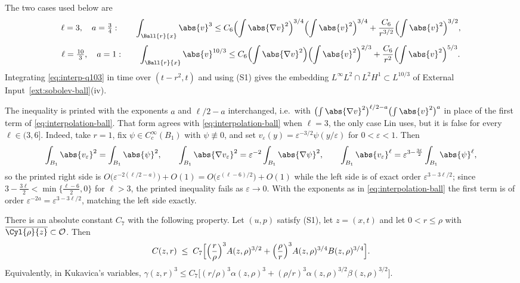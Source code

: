 \documentclass[11pt,reqno]{amsart}
\begin{document}
\begin{remark}\label{rem:interp-instances}
The two cases used below are
\begin{equation}\label{eq:interp-q3}
  \ell=3,\quad a=\tfrac34:\qquad
  \int_{\Ball{r}{x}}\abs{v}^{3}
   \le C_{6}\Bigl(\int\abs{\nabla v}^{2}\Bigr)^{3/4}\Bigl(\int\abs{v}^{2}\Bigr)^{3/4}
     +\frac{C_{6}}{r^{3/2}}\Bigl(\int\abs{v}^{2}\Bigr)^{3/2},
\end{equation}
\begin{equation}\label{eq:interp-q103}
  \ell=\tfrac{10}{3},\quad a=1:\qquad
  \int_{\Ball{r}{x}}\abs{v}^{10/3}
   \le C_{6}\Bigl(\int\abs{\nabla v}^{2}\Bigr)\Bigl(\int\abs{v}^{2}\Bigr)^{2/3}
     +\frac{C_{6}}{r^{2}}\Bigl(\int\abs{v}^{2}\Bigr)^{5/3}.
\end{equation}
Integrating \eqref{eq:interp-q103} in time over $(t-r^{2},t)$ and using (S1)
gives the embedding $L^{\infty}L^{2}\cap L^{2}H^{1}\subset L^{10/3}$ of
External Input~\ref{ext:sobolev-ball}(iv).

The inequality \cite[(2.1)]{Lin1998} is printed with the exponents $a$ and
$\ell/2-a$ interchanged, i.e.\ with
$\bigl(\int\abs{\nabla v}^{2}\bigr)^{\ell/2-a}\bigl(\int\abs{v}^{2}\bigr)^{a}$ in
place of the first term of \eqref{eq:interpolation-ball}. That form agrees with
\eqref{eq:interpolation-ball} when $\ell=3$, the only case Lin uses, but it is
false for every $\ell\in(3,6]$. Indeed, take $r=1$, fix
$\psi\in C_{c}^{\infty}(B_{1})$ with $\psi\not\equiv0$, and set
$v_{\varepsilon}(y)=\varepsilon^{-3/2}\psi(y/\varepsilon)$ for
$0<\varepsilon<1$. Then
\[
  \int_{B_{1}}\abs{v_{\varepsilon}}^{2}=\int_{B_{1}}\abs{\psi}^{2},
  \qquad
  \int_{B_{1}}\abs{\nabla v_{\varepsilon}}^{2}
    =\varepsilon^{-2}\int_{B_{1}}\abs{\nabla\psi}^{2},
  \qquad
  \int_{B_{1}}\abs{v_{\varepsilon}}^{\ell}
    =\varepsilon^{3-\frac{3\ell}{2}}\int_{B_{1}}\abs{\psi}^{\ell},
\]
so the printed right side is
$O\bigl(\varepsilon^{-2(\ell/2-a)}\bigr)+O(1)=O\bigl(\varepsilon^{(\ell-6)/2}\bigr)+O(1)$
while the left side is of exact order $\varepsilon^{3-3\ell/2}$; since
$3-\tfrac{3\ell}{2}<\min\{\tfrac{\ell-6}{2},0\}$ for $\ell>3$, the printed inequality
fails as $\varepsilon\to0$. With the exponents as in
\eqref{eq:interpolation-ball} the first term is of order
$\varepsilon^{-2a}=\varepsilon^{3-3\ell/2}$, matching the left side exactly.
\end{remark}

\begin{lemma}\label{lem:interpolation-cylinder}
There is an absolute constant $C_{7}$ with the following property. Let $(u,p)$
satisfy (S1), let $z=(x,t)$ and let $0<r\le\rho$ with
$\overline{\Cyl{\rho}{z}}\subset\mathcal{O}$. Then
\begin{equation}\label{eq:lemma-C-decay}
  C(z,r)\;\le\;C_{7}\Bigl[\Bigl(\frac r\rho\Bigr)^{3}A(z,\rho)^{3/2}
     +\Bigl(\frac\rho r\Bigr)^{3}A(z,\rho)^{3/4}B(z,\rho)^{3/4}\Bigr].
\end{equation}
Equivalently, in Kukavica's variables,
$\gamma(z,r)^{3}\le C_{7}\bigl[(r/\rho)^{3}\alpha(z,\rho)^{3}
 +(\rho/r)^{3}\alpha(z,\rho)^{3/2}\beta(z,\rho)^{3/2}\bigr]$.
\end{lemma}
\end{document}
